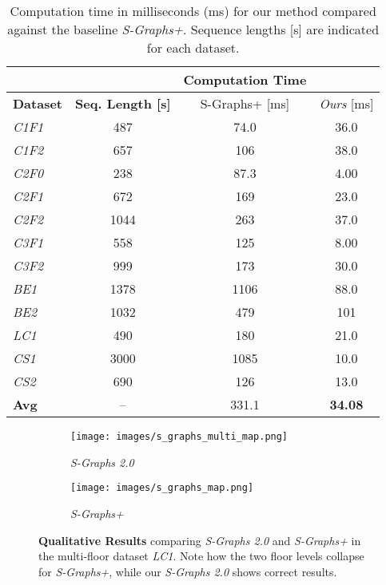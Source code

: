 \begin{table}[]
\centering
\renewcommand{\arraystretch}{0.8} %
\setlength{\tabcolsep}{3pt}       %
\footnotesize
\caption{Computation time in milliseconds (ms) for our method compared against the baseline \textit{S-Graphs+}. Sequence lengths [s] are indicated for each dataset.}
\label{tab:computation_time}
\begin{tabular}{l|c|c c}
\toprule
& & \textbf{Computation Time} \\
\midrule
\textbf{Dataset} & \textbf{Seq. Length [s]} & S-Graphs+ [ms] & \textit{Ours} [ms] \\
\midrule
{\textit{C1F1}} & 487   & 74.0  & 36.0 \\
{\textit{C1F2}} & 657   & 106   & 38.0 \\
{\textit{C2F0}} & 238   & 87.3  & 4.00 \\
{\textit{C2F1}} & 672   & 169   & 23.0 \\
{\textit{C2F2}} & 1044  & 263   & 37.0 \\
{\textit{C3F1}} & 558   & 125   & 8.00 \\
{\textit{C3F2}} & 999   & 173   & 30.0 \\
\midrule
{\textit{BE1}}  & 1378  & 1106  & 88.0 \\
{\textit{BE2}}  & 1032  & 479   & 101  \\
{\textit{LC1}}  & 490   & 180   & 21.0 \\
{\textit{CS1}}  & 3000  & 1085  & 10.0 \\
{\textit{CS2}}  & 690   & 126   & 13.0 \\
\midrule
\textbf{Avg} & --  & 331.1 & \textbf{34.08} \\
\bottomrule
\end{tabular}
\end{table}

\begin{figure}[t]
\centering
\begin{subfigure}[t]{.45\textwidth}
\centering
\texttt{[image: images/s\_graphs\_multi\_map.png]}
\caption{{\textit{S-Graphs 2.0}}}
\label{fig:3d_map_s_graphs}
\end{subfigure}
\begin{subfigure}[t]{0.45\textwidth}
\centering
\texttt{[image: images/s\_graphs\_map.png]}
\caption{\textit{S-Graphs+}}
\label{fig:3d_map_hdl_slam}
\end{subfigure}
\caption{\textbf{Qualitative Results} comparing \textit{S-Graphs 2.0} and \textit{S-Graphs+} in the multi-floor dataset \textit{LC1}. Note how the two floor levels collapse for \textit{S-Graphs+}, while our \textit{S-Graphs 2.0} shows correct results.}
\label{fig:3d_map_l1c1}
\end{figure}


